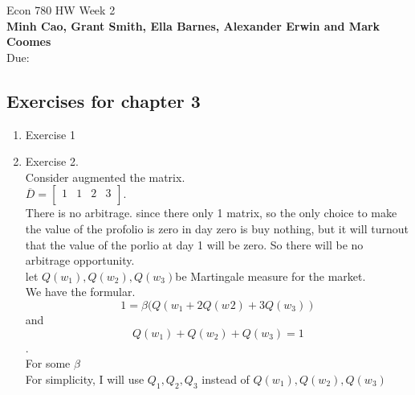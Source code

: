 \documentclass[12pt]{article}
\newcommand{\ol}{\overline}
\begin{document}
\begin{center}
{\Large Econ 780 \hspace{0.5cm} HW Week 2}\\
\textbf{Minh Cao, Grant Smith, Ella Barnes, Alexander Erwin and Mark Coomes}\\ %
Due:  %
\end{center}

\vspace{0.2 cm}


\subsection*{Exercises for chapter 3}

\begin{enumerate}




\item Exercise 1






\item Exercise 2.\\
 Consider augmented the matrix.\\
 
  $\ol{D}=
    \left[\begin{array}{llll}
    1 & 1 & 2 & 3\\
    \end{array}
    \right].$ 
    \\
    
    There is no arbitrage. since there only 1 matrix, so the only choice to make the value of the profolio is zero in day zero is buy nothing, but it will turnout that the value of the porlio at day 1 will be zero. So there will be no arbitrage opportunity.\\
    
    let $Q(w_{1}), Q(w_{2}), Q(w_{3})$be Martingale measure for the market.\\
    We have the formular.\\
    
    $$1 = \beta(Q(w_{1}+2Q(w_{}{2})+3Q(w_{3}))$$ and\\ 
 



$$Q(w_{1}) +  Q(w_{2})+ Q(w_{3}) = 1$$. \\ 
For some $\beta$\\
For simplicity, I will use $Q_{1}, Q_{2}, Q_{3}$ instead of $Q(w_{1}), Q(w_{2}), Q(w_{3})$


\end{enumerate}
\end{document}
